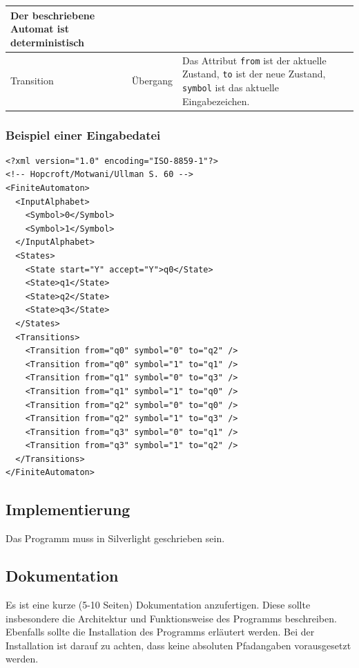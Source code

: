 {\begin{table}[H]
\begin{tabular}{|l|l|l|}
\begin{minipage}{0.5\textwidth}
		Der beschriebene Automat ist deterministisch
		\vspace{0.5ex}
	\end{minipage}\\ \hline
Transition     & Übergang             &
	\begin{minipage}{0.5\textwidth}
		Das Attribut \texttt{from} ist der aktuelle Zustand, \texttt{to} ist der neue
		Zustand, \texttt{symbol} ist das aktuelle Eingabezeichen.
		\vspace{0.5ex}
	\end{minipage}\\
\hline
\end{tabular}
\end{table}
}

\subsubsection*{Beispiel einer Eingabedatei}
\setmonofont[Scale=0.75]{Inconsolata}
\begin{multicols}{2}
\begin{verbatim}
<?xml version="1.0" encoding="ISO-8859-1"?> 
<!-- Hopcroft/Motwani/Ullman S. 60 --> 
<FiniteAutomaton> 
  <InputAlphabet> 
    <Symbol>0</Symbol> 
    <Symbol>1</Symbol> 
  </InputAlphabet> 
  <States> 
    <State start="Y" accept="Y">q0</State> 
    <State>q1</State> 
    <State>q2</State> 
    <State>q3</State> 
  </States> 
  <Transitions> 
    <Transition from="q0" symbol="0" to="q2" /> 
    <Transition from="q0" symbol="1" to="q1" /> 
    <Transition from="q1" symbol="0" to="q3" /> 
    <Transition from="q1" symbol="1" to="q0" /> 
    <Transition from="q2" symbol="0" to="q0" /> 
    <Transition from="q2" symbol="1" to="q3" /> 
    <Transition from="q3" symbol="0" to="q1" /> 
    <Transition from="q3" symbol="1" to="q2" /> 
  </Transitions> 
</FiniteAutomaton> 
\end{verbatim}
\end{multicols}
\setmonofont[Scale=0.90]{Inconsolata}


\subsection{Implementierung}
Das Programm muss in Silverlight geschrieben sein.

\subsection{Dokumentation}
Es ist eine kurze (5-10 Seiten) Dokumentation anzufertigen. Diese sollte
insbesondere die Architektur und Funktionsweise des Programms beschreiben.
Ebenfalls sollte die Installation des Programms erläutert werden. Bei der
Installation ist darauf zu achten, dass keine absoluten Pfadangaben
vorausgesetzt werden. 

